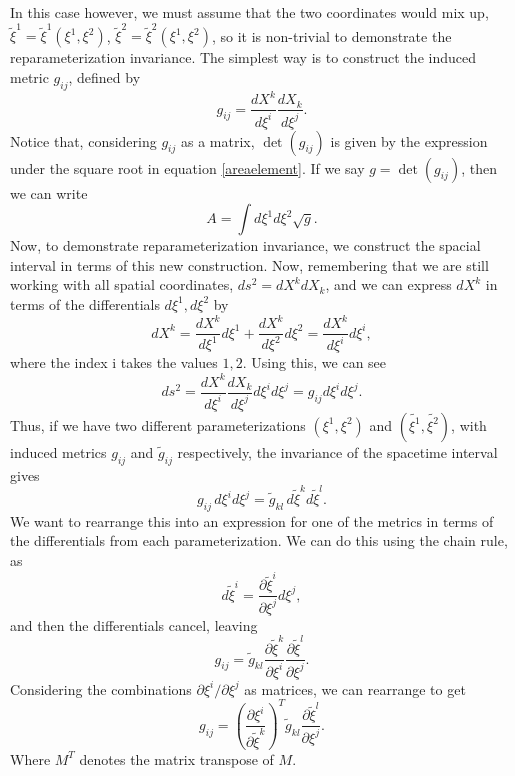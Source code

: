 \documentclass[a4paper,12pt]{article}
\numberwithin{equation}{section}
\begin{document}
In this case however, we must assume that the two coordinates would mix up, $\tilde{\xi}^1=\tilde{\xi}^1(\xi^1, \xi^2)$, $\tilde{\xi}^2 = \tilde{\xi}^2(\xi^1,\xi^2)$, so it is non-trivial to demonstrate the reparameterization invariance. The simplest way is to construct the induced metric $g_{i j}$, defined by
\begin{equation}
g_{i j } = \frac{dX^k}{d\xi^i}\frac{dX_k}{d\xi^j}.
\end{equation}
Notice that, considering $g_{ij}$ as a matrix, $\det(g_{i j})$ is given by the expression under the square root in equation \ref{areaelement}. If we say $g = \det(g_{i j})$, then we can write
\begin{equation}\label{gaction}
A = \int d\xi^1d\xi^2\sqrt{g}.
\end{equation}
Now, to demonstrate reparameterization invariance, we construct the spacial interval in terms of this new construction. Now, remembering that we are still working with all spatial coordinates, $ds^2 = dX^kdX_k$, and we can express $dX^k$ in terms of the differentials $d\xi^1, d\xi^2$ by
\begin{equation}
dX^k = \frac{dX^k}{d\xi^1}d\xi^1 + \frac{dX^k}{d\xi^2}d\xi^2 = \frac{dX^k}{d\xi^i}d\xi^i,
\end{equation}
where the index i takes the values $1, 2$.
Using this, we can see 
\begin{equation}
ds^2 = \frac{dX^k}{d\xi^i}\frac{dX_k}{d\xi^j}d\xi^id\xi^j = g_{i j}d\xi^id\xi^j.
\end{equation}
Thus, if we have two different parameterizations $(\xi^1, \xi^2)$ and $(\tilde{\xi^1}, \tilde{\xi^2})$, with induced metrics $g_{i j}$ and $\tilde{g}_{i j}$ respectively, the invariance of the spacetime interval gives
\begin{equation}
g_{i j }\, d\xi^i d\xi^j = \tilde{g}_{k l}\, d\tilde{\xi}^k d\tilde{\xi}^l.
\end{equation}
We want to rearrange this into an expression for one of the metrics in terms of the differentials from each parameterization. We can do this using the chain rule, as
\begin{equation}
d\tilde{\xi}^i = \frac{\partial \tilde{\xi}^i}{\partial \xi^j}d\xi^j,
\end{equation}
and then the differentials cancel, leaving 
\begin{equation}\label{gij}
g_{i j} = \tilde{g}_{k l} \frac{\partial \tilde{\xi}^k}{\partial \xi^i}\frac{\partial \tilde{\xi}^l}{\partial \xi^j}.
\end{equation}
Considering the combinations $\partial{\xi}^i/\partial{\xi}^j$ as matrices, we can rearrange to get
\begin{equation}\label{gijdet}
g_{i j} = \left(\frac{\partial \xi^i}{\partial \tilde{\xi}^k}\right)^T\tilde{g}_{k l} \frac{\partial \tilde{\xi}^l}{\partial \xi^j}.
\end{equation}
Where $M^T$ denotes the matrix transpose of $M$.
\end{document}
